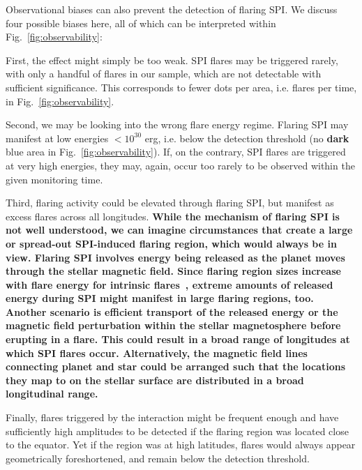 \documentclass[fleqn,usenatbib]{mnras}%
\begin{document}
Observational biases can also prevent the detection of flaring SPI. We discuss four possible biases here, all of which can be interpreted within Fig.~\ref{fig:observability}:

First, the effect might simply be too weak. SPI flares may be triggered rarely, with only a handful of flares in our sample, which are not detectable with sufficient significance. This corresponds to fewer dots per area, i.e. flares per time, in Fig.~\ref{fig:observability}.

Second, we may be looking into the wrong flare energy regime. Flaring SPI may manifest at low energies $<10^{30}$ erg, i.e. below the detection threshold (no \textbf{dark} blue area in Fig.~\ref{fig:observability}). If, on the contrary, SPI flares are triggered at very high energies, they may, again, occur too rarely to be observed within the given monitoring time. 

Third, flaring activity could be elevated through flaring SPI, but manifest as excess flares across all longitudes. \textbf{While the mechanism of flaring SPI is not well understood, we can imagine circumstances that create a large or spread-out SPI-induced flaring region, which would always be in view. Flaring SPI involves energy being released as the planet moves through the stellar magnetic field. Since flaring region sizes increase with flare energy for intrinsic flares~\citep{sammis2000dependence, notsu2019kepler, howard2020evryflare}, extreme amounts of released energy during SPI might manifest in large flaring regions, too. Another scenario is efficient transport of the released energy or the magnetic field perturbation within the stellar magnetosphere before erupting in a flare. This could result in a broad range of longitudes at which SPI flares occur. Alternatively, the magnetic field lines connecting planet and star could be arranged such that the locations they map to on the stellar surface are distributed in a broad longitudinal range.}

Finally, flares triggered by the interaction might be frequent enough and have sufficiently high amplitudes to be detected if the flaring region was located close to the equator. Yet if the region was at high latitudes, flares would always appear geometrically foreshortened, and remain below the detection threshold.
\end{document}
